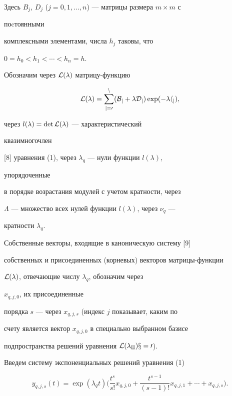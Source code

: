 Здесь $B_j$, $D_j$ ($j=0,1,\dotsc,n$) --- матрицы размера $m\times m$ с 


поcтоянными 


комплексными элементами, числа $h_j$ таковы, что 


$0=h_0<h_1<\dotsb<h_n=h$. 


 


Обозначим через $\cal L(\lambda)$ матрицу-функцию 


$$ 


\cal L(\lambda)=\sum^n_{j=0}(B_j+\lambda D_j)\exp(-\lambda h_j), 


$$ 


через $l(\lambda)=\det\cal L(\lambda)$ --- характеристический 


квазимногочлен 


[8] уравнения (1), через $\lambda_q$ --- нули функции $l(\lambda)$, 


упорядоченные 


в порядке возрастания модулей с учетом кратности, через 


$\Lambda$ --- множество всех нулей функции $l(\lambda)$, через $\nu_q$ --- 


кратности $\lambda_q$. 


 


Собственные векторы, входящие в каноническую систему [9] 


собственных и присоединенных (корневых) векторов матрицы-функции 


$\cal L(\lambda)$, отвечающие числу $\lambda_q$, обозначим через 


$x_{q,j,0}$, их присоединенные 


порядка $s$ --- через $x_{q,j,s}$ (индекс $j$ показывает, каким по 


счету является вектор $x_{q,j,0}$ в специально выбранном базисе 


подпространства решений уравнения $\cal L(\lambda_q)x=0$). 


 


Введем систему экспоненциальных решений уравнения (1) 


\begin{equation} 


y_{q,j,s}(t)=\exp(\lambda_q t)\bigg( 


\frac{t^s}{s!}x_{q,j,0}+\frac{t^{s-1}}{(s-1)!}x_{q,j,1}+\dotsb+ 


x_{q,j,s}\bigg). 


\end{equation} 


